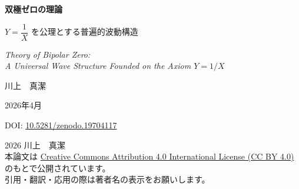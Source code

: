 \documentclass[12pt, a4paper]{article}
\theoremstyle{definition}
\newcommand{\Switch}{\Theta}
\begin{document}
\begin{titlepage}
  \centering
  \vspace*{3cm}

  {\Huge\bfseries\sffamily 双極ゼロの理論}

  \vspace{0.8cm}

  {\Large\sffamily\color{headerblue}
    $Y = \dfrac{1}{X}$ を公理とする普遍的波動構造}

  \vspace{1.2cm}

  {\large\itshape
    Theory of Bipolar Zero:\\[0.3em]
    A Universal Wave Structure Founded on the Axiom $Y = 1/X$}

  \vspace{3cm}

  {\large 川上　真潔}

  \vspace{0.5cm}

  {\normalsize 2026年4月}

  \vspace{0.8cm}

  {\small\ttfamily DOI:
    \href{https://doi.org/10.5281/zenodo.19704117}{10.5281/zenodo.19704117}}

  \vspace{0.8cm}

  \begin{small}
    \textcopyright{} 2026 川上　真潔\\[0.3em]
    本論文は
    \href{https://creativecommons.org/licenses/by/4.0/}{%
      Creative Commons Attribution 4.0 International License (CC BY 4.0)}
    のもとで公開されています。\\
    引用・翻訳・応用の際は著者名の表示をお願いします。
  \end{small}

  \vfill

  \begin{abstract}
    \noindent
    本論文は，$Y = 1/X$ という単一の数学的関係式を唯一の公理（公理零番）として採用し，
    そこから「双極ゼロ」の概念，波の必然的発生，球体モデルによる共振と減衰の分離，
    存在スイッチ関数 $\Switch(\mathbf{v})$ による連鎖作用，
    および理論の基底非依存的普遍性を演繹する体系的理論を提示する．

    本理論において「ゼロ」は単なる「無」ではない．
    $X \to 0$ における $Y \to \infty$（起源のゼロ）と，
    $X \to \infty$ における $Y \to 0$（平衡のゼロ）は，
    同一構造の両極として定義される．
    この双極性から，波の発生は選択ではなく数学的必然として導出される．


\end{abstract}
\end{titlepage}
\end{document}
